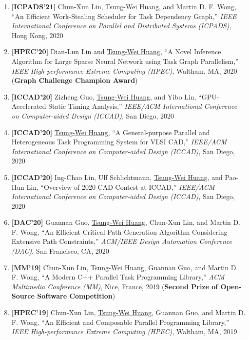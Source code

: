 \documentclass[A4,11pt]{article}
\begin{document}
\begin{enumerate}
    \item \textbf{[ICPADS'21]} Chun-Xun Lin, \underline{Tsung-Wei Huang}, and Martin D. F. Wong, ``An Efficient Work-Stealing Scheduler for Task Dependency Graph,'' \textit{IEEE International Conference on Parallel and Distributed Systems (ICPADS)}, Hong Kong, 2020

    \item \textbf{[HPEC'20]} Dian-Lun Lin and \underline{Tsung-Wei Huang}, ``A Novel Inference Algorithm for Large Sparse Neural Network using Task Graph Parallelism,'' \textit{IEEE High-performance Extreme Computing (HPEC)}, Waltham, MA, 2020 (\textbf{Graph Challenge Champion Award})

    \item \textbf{[ICCAD'20]} Zizheng Guo, \underline{Tsung-Wei Huang}, and Yibo Lin, ``GPU-Accelerated Static Timing Analysis,'' \textit{IEEE/ACM International Conference on Computer-aided Design (ICCAD)}, San Diego, 2020 

    \item \textbf{[ICCAD'20]} \underline{Tsung-Wei Huang}, ``A General-purpose Parallel and Heterogeneous Task Programming System for VLSI CAD,'' \textit{IEEE/ACM International Conference on Computer-aided Design (ICCAD)}, San Diego, 2020

    \item \textbf{[ICCAD'20]} Ing-Chao Lin, Ulf Schlichtmann, \underline{Tsung-Wei Huang}, and Pao-Hun Lin, ``Overview of 2020 CAD Contest at ICCAD,'' \textit{IEEE/ACM International Conference on Computer-aided Design (ICCAD)}, San Diego, 2020

    \item \textbf{[DAC'20]} Guannan Guo, \underline{Tsung-Wei Huang}, Chun-Xun Lin, and Martin D. F. Wong, ``An Efficient Critical Path Generation Algorithm Considering Extensive Path Constraints,'' \textit{ACM/IEEE Design Automation Conference (DAC)}, San Francisco, CA, 2020

    \item \textbf{[MM'19]} Chun-Xun Lin, \underline{Tsung-Wei Huang}, Guannan Guo, and Martin D. F. Wong, ``A Modern C++ Parallel Task Programming Library,'' \textit{ACM Multimedia Conference (MM)}, Nice, France, 2019 (\textbf{Second Prize of Open-Source Software Competition})

    \item \textbf{[HPEC'19]} Chun-Xun Lin, \underline{Tsung-Wei Huang}, Guannan Guo, and Martin D. F. Wong, ``An Efficient and Composable Parallel Programming Library,'' \textit{IEEE High-performance Extreme Computing (HPEC)}, Waltham, MA, 2019


\end{enumerate}
\end{document}

